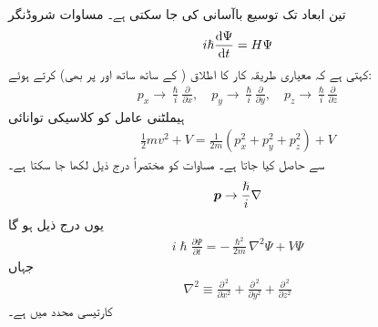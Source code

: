 




تین ابعاد تک توسیع باآسانی کی جا سکتی ہے۔ مساوات شروڈنگر
\begin{align}
i\hslash\frac{\dif{\Psi}}{\dif{t}}=H\Psi
\end{align}
 کہتی ہے کہ معیاری طریقہ کار کا اطلاق ( کے ساتھ ساتھ  اور  پر بھی) کرتے ہوئے:
\begin{align}\label{مساوات_تین_ابعاد_عاملین_الف}
 p_{x}\to \frac{\hslash}{i}\frac{\partial}{\partial{x}},\quad p_{y}\to \frac{\hslash}{i}\frac{\partial}{\partial{y}},\quad p_{z}\to \frac{\hslash}{i}\frac{\partial}{\partial{z}} 
\end{align}
ہیملٹنی عامل  کو کلاسیکی توانائی
\begin{align*}
\frac{1}{2}mv^{2}+V=\frac{1}{2m}(p_{x}^{2}+p_{y}^{2}+p_{z}^{2})+V
\end{align*}
سے حاصل کیا جاتا ہے۔ مساوات  کو مختصراً درج ذیل لکھا جا سکتا ہے۔
\begin{align}
{\ensuremath{{\boldsymbol{p}}}}\to \frac{\hslash}{i}\nabla
\end{align}
یوں درج ذیل ہو گا
\begin{align}
i\hslash\frac{\partial{\Psi}}{\partial{t}}=-\frac{\hslash^{2}}{2m}\nabla^{2}\Psi+V\Psi
\end{align}
جہاں
\begin{align}
\nabla^{2}\equiv \frac{\partial^{\,2}}{\partial{x^2}}+\frac{\partial^{\,2}}{\partial{y^2}}+\frac{\partial^{\,2}}{\partial{z^2}} 
\end{align}
کارتیسی محدد میں  ہے۔

